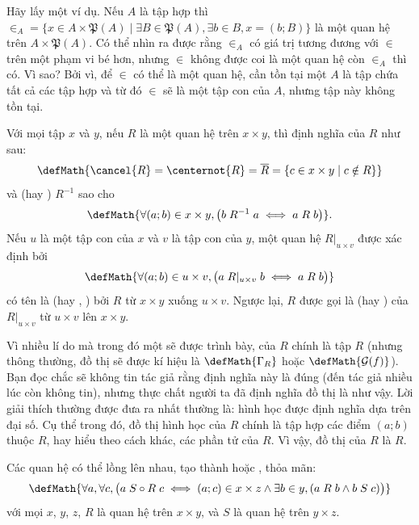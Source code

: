 Hãy lấy một ví dụ. Nếu $A$ là tập hợp thì $\in_A = \{x \in A \times \mathfrak{P}(A) \mid \exists B\in \mathfrak{P}(A), \exists b\in B, x = (b; B)\}$ là một quan hệ trên $A \times \mathfrak{P}(A)$. Có thể nhìn ra được rằng $\in_A$ có giá trị tương đương với $\in$ trên một phạm vi bé hơn, nhưng $\in$ không được coi là một quan hệ còn $\in_A$ thì có. Vì sao? Bởi vì, để $\in$ có thể là một quan hệ, cần tồn tại một $A$ là tập chứa tất cả các tập hợp và từ đó $\in$ sẽ là một tập con của $A$, nhưng tập này không tồn tại.

Với mọi tập $x$ và $y$, nếu $R$ là một quan hệ trên $x \times y$, thì định nghĩa  của $R$ như sau:
\begin{equation*}
   \defMath{\cancel{R} = \centernot{R} = \overline{R} = \{c \in x \times y \mid c \notin R\}}
\end{equation*}
và  (hay ) $R^{-1}$ sao cho
\begin{equation*}
   \defMath{\forall (a; b) \in x \times y, \big(b\;R^{-1}\;a \iff a\;R\;b\big)}.
\end{equation*}
Nếu $u$ là một tập con của $x$ và $v$ là tập con của $y$, một quan hệ $R|_{u \times v}$ được xác định bởi
\begin{equation*}
   \defMath{\forall (a; b) \in u \times v, \big(a\;R|_{u \times v}\;b \iff a\;R\;b\big)}  
\end{equation*}
có tên là  (hay , ) bởi $R$ từ $x \times y$ xuống $u \times v$. Ngược lại, $R$ được gọi là  (hay ) của $R|_{u \times v}$ từ $u \times v$ lên $x \times y$.

Vì nhiều lí do mà trong đó một sẽ được trình bày,  của $R$ chính là tập $R$ (nhưng thông thường, đồ thị sẽ được kí hiệu là $\defMath{\Gamma_R}$ hoặc $\defMath{\mathcal{G}(f)}$). Bạn đọc chắc sẽ không tin tác giả rằng định nghĩa này là đúng (đến tác giả nhiều lúc còn không tin), nhưng thực chất người ta đã định nghĩa đồ thị là như vậy. Lời giải thích thường được đưa ra nhất thường là: hình học được định nghĩa dựa trên đại số. Cụ thể trong đó, đồ thị hình học của $R$ chính là tập hợp các điểm $(a; b)$ thuộc $R$, hay hiểu theo cách khác, các phần tử của $R$. Vì vậy, đồ thị của $R$ là $R$.

Các quan hệ có thể lồng lên nhau, tạo thành  hoặc , thỏa mãn:
\begin{equation*}
   \defMath{\forall a, \forall c, \big(a\;S\circ R\;c\iff (a; c) \in x \times z \land \exists b \in y, (a\;R\;b \land b\;S\;c)\big)}
\end{equation*}
với mọi $x$, $y$, $z$, $R$ là quan hệ trên $x \times y$, và $S$ là quan hệ trên $y \times z$. 

